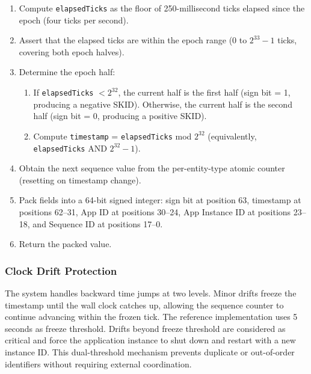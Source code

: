 \documentclass[fleqn,10pt,lineno]{wlpeerj}
\providecommand{\tightlist}{%
  \setlength{\itemsep}{0pt}\setlength{\parskip}{0pt}}
\begin{document}
\begin{enumerate}
\def\labelenumi{\arabic{enumi}.}
\tightlist
\item
  Compute \texttt{elapsedTicks} as the floor of 250-millisecond ticks
  elapsed since the epoch (four ticks per second).
\item
  Assert that the elapsed ticks are within the epoch range (0 to
  \(2^{33} - 1\) ticks, covering both epoch halves).
\item
  Determine the epoch half:

  \begin{enumerate}
  \def\labelenumii{\arabic{enumii}.}
  \tightlist
  \item
    If \texttt{elapsedTicks} \(< 2^{32}\), the current half is the first
    half (sign bit = 1, producing a negative SKID). Otherwise, the
    current half is the second half (sign bit = 0, producing a positive
    SKID).
  \item
    Compute \texttt{timestamp} = \texttt{elapsedTicks} mod \(2^{32}\)
    (equivalently, \texttt{elapsedTicks} AND \(2^{32} - 1\)).
  \end{enumerate}
\item
  Obtain the next sequence value from the per-entity-type atomic counter
  (resetting on timestamp change).
\item
  Pack fields into a 64-bit signed integer: sign bit at position 63,
  timestamp at positions 62--31, App ID at positions 30--24, App
  Instance ID at positions 23--18, and Sequence ID at positions 17--0.
\item
  Return the packed value.
\end{enumerate}

\subsubsection{Clock Drift Protection}\label{clock-drift-protection}

The system handles backward time jumps at two levels. Minor drifts
freeze the timestamp until the wall clock catches up, allowing the
sequence counter to continue advancing within the frozen tick. The
reference implementation uses 5 seconds as freeze threshold. Drifts
beyond freeze threshold are considered as critical and force the
application instance to shut down and restart with a new instance ID.
This dual-threshold mechanism prevents duplicate or out-of-order
identifiers without requiring external coordination.

\newpage
\end{document}
